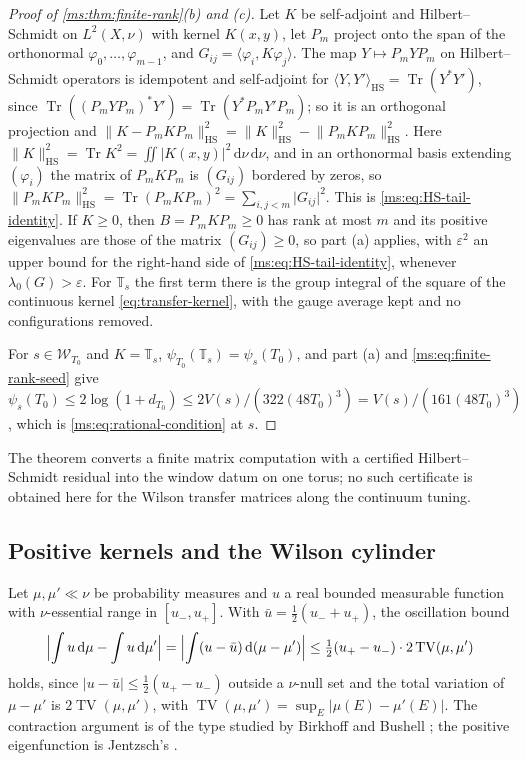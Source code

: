 \documentclass[11pt,a4paper]{amsart}
\theoremstyle{definition}
\theoremstyle{remark}
\numberwithin{equation}{section}
\DeclareMathOperator{\Tr}{Tr}        %
\DeclareMathOperator{\TV}{TV}        %
\newcommand{\Wwin}{\mathcal{W}}      %
\newcommand{\ip}[2]{\langle #1,#2\rangle}  %
\newcommand{\norm}[1]{\lVert #1\rVert}     %
\newcommand{\abs}[1]{\lvert #1\rvert}      %
\newcommand{\dd}{\,\mathrm{d}}             %
\newcommand{\TT}{\mathbb{T}}               %
\newcommand{\psiT}[2]{\psi_{#1}(#2)}       %
\newcommand{\Vol}[1]{V(#1)}                %
\begin{document}
\begin{proof}[Proof of \cref{ms:thm:finite-rank}(b) and (c)]
Let $K$ be self-adjoint and Hilbert--Schmidt on $L^2(X,\nu)$ with kernel $K(x,y)$, let $P_m$ project onto the span of the orthonormal $\varphi_0,\dots,\varphi_{m-1}$, and $G_{ij}=\ip{\varphi_i}{K\varphi_j}$. The map $Y\mapsto P_mYP_m$ on Hilbert--Schmidt operators is idempotent and self-adjoint for $\ip{Y}{Y'}_{\mathrm{HS}}=\Tr(Y^*Y')$, since $\Tr((P_mYP_m)^*Y')=\Tr(Y^*P_mY'P_m)$; so it is an orthogonal projection and $\norm{K-P_mKP_m}_{\mathrm{HS}}^2=\norm{K}_{\mathrm{HS}}^2-\norm{P_mKP_m}_{\mathrm{HS}}^2$. Here $\norm{K}_{\mathrm{HS}}^2=\Tr K^2=\iint\abs{K(x,y)}^2\dd\nu\dd\nu$, and in an orthonormal basis extending $(\varphi_i)$ the matrix of $P_mKP_m$ is $(G_{ij})$ bordered by zeros, so $\norm{P_mKP_m}_{\mathrm{HS}}^2=\Tr(P_mKP_m)^2=\sum_{i,j<m}\abs{G_{ij}}^2$. This is \eqref{ms:eq:HS-tail-identity}. If $K\ge0$, then $B=P_mKP_m\ge0$ has rank at most $m$ and its positive eigenvalues are those of the matrix $(G_{ij})\ge0$, so part (a) applies, with $\varepsilon^2$ an upper bound for the right-hand side of \eqref{ms:eq:HS-tail-identity}, whenever $\lambda_0(G)>\varepsilon$. For $\TT_s$ the first term there is the group integral of the square of the continuous kernel \eqref{eq:transfer-kernel}, with the gauge average kept and no configurations removed.

For $s\in\Wwin_{T_0}$ and $K=\TT_s$, $\psi_{T_0}(\TT_s)=\psiT{s}{T_0}$, and part (a) and \eqref{ms:eq:finite-rank-seed} give $\psiT{s}{T_0}\le2\log(1+d_{T_0})\le2\Vol{s}/(322(48T_0)^3)=\Vol{s}/(161(48T_0)^3)$, which is \eqref{ms:eq:rational-condition} at $s$.
\end{proof}

The theorem converts a finite matrix computation with a certified Hilbert--Schmidt residual into the window datum on one torus; no such certificate is obtained here for the Wilson transfer matrices along the continuum tuning.

\subsection{Positive kernels and the Wilson cylinder}
Let $\mu,\mu'\ll\nu$ be probability measures and $u$ a real bounded measurable function with $\nu$-essential range in $[u_-,u_+]$. With $\bar u=\frac12(u_-+u_+)$, the oscillation bound
\[
\Bigl\lvert\int u\dd\mu-\int u\dd\mu'\Bigr\rvert=\Bigl\lvert\int(u-\bar u)\dd(\mu-\mu')\Bigr\rvert\le\tfrac12(u_+-u_-)\cdot2\TV(\mu,\mu')
\]
holds, since $\abs{u-\bar u}\le\frac12(u_+-u_-)$ outside a $\nu$-null set and the total variation of $\mu-\mu'$ is $2\TV(\mu,\mu')$, with $\TV(\mu,\mu')=\sup_E\abs{\mu(E)-\mu'(E)}$.
The contraction argument is of the type studied by Birkhoff and Bushell \cite{birkhoff1957,bushell1973}; the positive eigenfunction is Jentzsch's \cite{jentzsch1912}.
\end{document}
